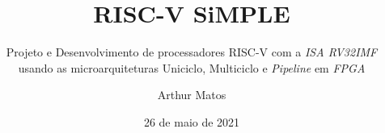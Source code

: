 \documentclass{beamer}
\title{RISC-V SiMPLE}
\subtitle{Projeto e Desenvolvimento de processadores RISC-V com a \textit{ISA RV32IMF} usando as microarquiteturas Uniciclo, Multiciclo e \textit{Pipeline} em \textit{FPGA}}
\author{Arthur Matos}
\institute{Universidade de Brasília - UnB}
\date{26 de maio de 2021}
\begin{document}
\begin{frame}
\titlepage
\end{frame}
\end{document}

